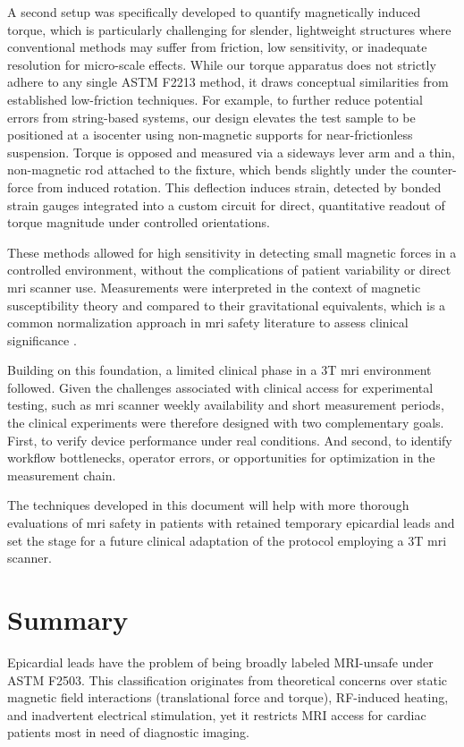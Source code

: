 A second setup was specifically developed to quantify magnetically induced torque, which is particularly challenging for slender, lightweight structures where conventional methods may suffer from friction, low sensitivity, or inadequate resolution for micro-scale effects. While our torque apparatus does not strictly adhere to any single ASTM F2213 method, it draws conceptual similarities from established low-friction techniques. For example, to further reduce potential errors from string-based systems, our design elevates the test sample to be positioned at a isocenter using non-magnetic supports for near-frictionless suspension. Torque is opposed and measured via a sideways lever arm and a thin, non-magnetic rod attached to the fixture, which bends slightly under the counter-force from induced rotation. This deflection induces strain, detected by bonded strain gauges integrated into a custom circuit for direct, quantitative readout of torque magnitude under controlled orientations.

These methods allowed for high sensitivity in detecting small magnetic forces in a controlled environment, without the complications of patient variability or direct \gls{mri} scanner use. Measurements were interpreted in the context of magnetic susceptibility theory and compared to their gravitational equivalents, which is a common normalization approach in \gls{mri} safety literature to assess clinical significance \cite{astmF2052,haddixProposal}. 

Building on this foundation, a limited clinical phase in a 3T \gls{mri} environment followed. Given the challenges associated with clinical access for experimental testing, such as \gls{mri} scanner weekly availability and short measurement periods, the clinical experiments were therefore designed with two complementary goals. First, to verify device performance under real conditions. And second, to identify workflow bottlenecks, operator errors, or opportunities for optimization in the measurement chain. 

The techniques developed in this document will help with more thorough evaluations of  \gls{mri} safety in patients with retained temporary epicardial leads and set the stage for a future clinical adaptation of the protocol employing a 3T \gls{mri} scanner.

\section{Summary}
Epicardial leads have the problem of being broadly labeled MRI-unsafe under ASTM F2503. This classification originates from theoretical concerns over static magnetic field interactions (translational force and torque), RF-induced heating, and inadvertent electrical stimulation, yet it restricts MRI access for cardiac patients most in need of diagnostic imaging.


